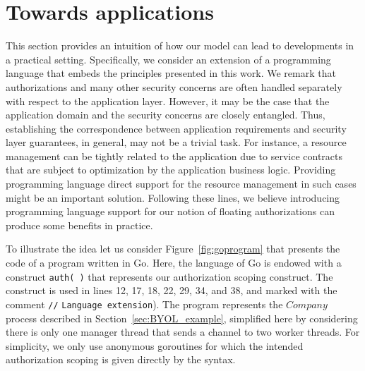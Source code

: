 \section{Towards applications}\label{sec:go_program}


This section provides an intuition of how our model can lead to developments in a practical setting. 
Specifically, we consider an extension of a programming language that 
embeds the principles presented in this work. 
We remark that authorizations and many other security concerns
are often handled separately with respect to the application layer.
However, it may be the case that the application domain and the security concerns are closely entangled. Thus, establishing the correspondence between application requirements 
and security layer guarantees, in general, may not be a trivial task.
For instance, a resource management can be tightly related to the application 
due to service contracts that are subject to optimization by the application business logic. 
Providing programming language direct support for the resource management in such cases might be an important  solution.
%
Following these lines, we believe introducing programming language support for our notion of floating authorizations  can produce some benefits in practice.

To illustrate the idea let us consider Figure~\ref{fig:goprogram} that presents the code of a program written in Go. Here, the language of Go is endowed
with a construct \lstinline{auth( )} that represents our authorization scoping construct. The construct is used in lines 12, 17, 18, 22, 29, 34, and 38, and marked with the comment \lstinline{//} \lstinline{Language extension}).
The program represents the $\mathit{Company}$ process described in Section~\ref{sec:BYOL_example}, simplified here by considering there is only one manager thread that sends a channel to two worker threads. %
For simplicity, we only use anonymous goroutines for which the intended authorization scoping is given directly by the syntax.

